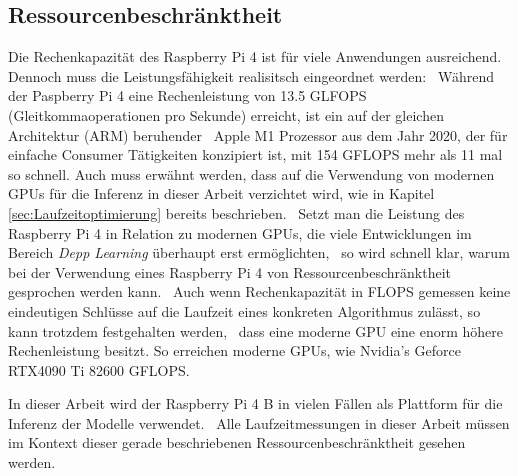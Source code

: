 \subsection{Ressourcenbeschränktheit}\label{subsec:RaspberryPi4BRessourcenbeschraenktheit}
Die Rechenkapazität des Raspberry Pi 4 ist für viele Anwendungen ausreichend. Dennoch muss die Leistungsfähigkeit realisitsch eingeordnet werden: \
Während der Paspberry Pi 4 eine Rechenleistung von \num{13,5} GLFOPS (Gleitkommaoperationen pro Sekunde) erreicht, ist ein auf der gleichen Architektur (ARM) beruhender \
Apple M1 Prozessor aus dem Jahr 2020, der für einfache Consumer Tätigkeiten konzipiert ist, mit \num{154} GFLOPS mehr als 11 mal so schnell. \cite{flopscpu}
Auch muss erwähnt werden, dass auf die Verwendung von modernen GPUs für die Inferenz in dieser Arbeit verzichtet wird, wie in Kapitel \ref{sec:Laufzeitoptimierung} bereits beschrieben. \
Setzt man die Leistung des Raspberry Pi 4 in Relation zu modernen GPUs, die viele Entwicklungen im Bereich \textit{Depp Learning} überhaupt erst ermöglichten, \
so wird schnell klar, warum bei der Verwendung eines Raspberry Pi 4 von \glqq Ressourcenbeschränktheit\grqq{} gesprochen werden kann. \
Auch wenn Rechenkapazität in FLOPS gemessen keine eindeutigen Schlüsse auf die Laufzeit eines konkreten Algorithmus zulässt, so kann trotzdem festgehalten werden, \
dass eine moderne GPU eine enorm höhere Rechenleistung besitzt. So erreichen moderne GPUs, wie Nvidia's Geforce RTX4090 Ti \num{82600} GFLOPS.\cite{flopsrtx4090}\

In dieser Arbeit wird der Raspberry Pi 4 B in vielen Fällen als Plattform für die Inferenz der Modelle verwendet. \
Alle Laufzeitmessungen in dieser Arbeit müssen im Kontext dieser gerade beschriebenen Ressourcenbeschränktheit gesehen werden. \
